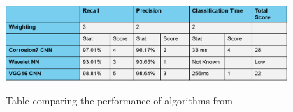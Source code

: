 \documentclass[11pt]{article}		%
\newcommand{\supercite}[1]{\textsuperscript{\cite{#1}}}		%
\begin{document}
			\begin{table}[h]
				\centering
				\includegraphics[width=0.8\textwidth]{CNN_corrosion_table}
				\caption{Table comparing the performance of algorithms from \cite{Corrosion7}}
				\label{CNN_comparison}
			\end{table}
	        
\end{document}
